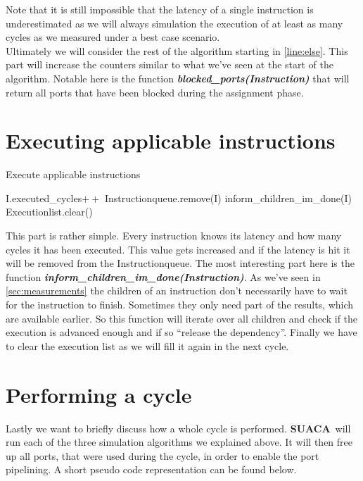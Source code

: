 \documentclass[a4paper,12pt,titlepage, twoside]{report}
\newcommand{\suaca}{\textbf{SUACA}}
\begin{document}
Note that it is still impossible that the latency of a single instruction is underestimated as we will always simulation the execution of at least as many cycles as we measured under a best case scenario.\\

Ultimately we will consider the rest of the algorithm starting in \autoref{line:else}. This part will increase the counters similar to what we've seen at the start of the algorithm. Notable here is the function \textbf{\emph{blocked\_ports(Instruction)}} that will return all ports that have been blocked during the assignment phase.



\section{Executing applicable instructions}
\label{sec:execute}

\begin{algorithm}[H]
    \SetAlgoLined
    \caption{Execute applicable instructions}
     {
        I.executed\_cycles$++$\;
         {
            Instructionqueue.remove(I)\;
        }
        inform\_children\_im\_done(I)\;
    }
    Executionlist.clear()\;
\end{algorithm}

This part is rather simple. Every instruction knows its latency and how many cycles it has been executed. This value gets increased and if the latency is hit it will be removed from the Instructionqueue. The most interesting part here is the function \textbf{\emph{inform\_children\_im\_done(Instruction)}}. As we've seen in \autoref{sec:measurements} the children of an instruction don't necessarily have to wait for the instruction to finish. Sometimes they only need part of the results, which are available earlier. So this function will iterate over all children and check if the execution is advanced enough and if so ``release the dependency''. Finally we have to clear the execution list as we will fill it again in the next cycle.

\section{Performing a cycle}

Lastly we want to briefly discuss how a whole cycle is performed. \suaca\ will run each of the three simulation algorithms we explained above. It will then free up all ports, that were used during the cycle, in order to enable the port pipelining. A short pseudo code representation can be found below.
\end{document}
